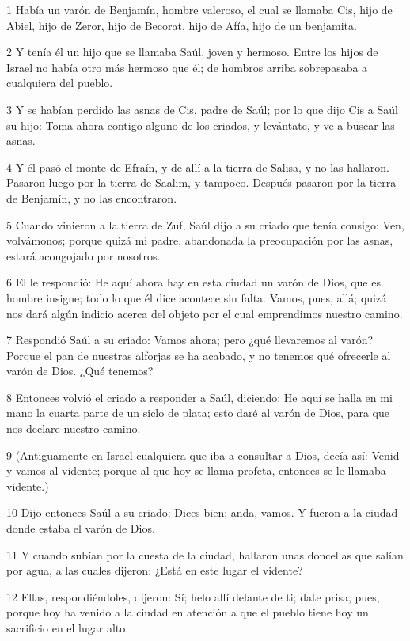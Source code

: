 \par 1 Había un varón de Benjamín, hombre valeroso, el cual se llamaba Cis, hijo de Abiel, hijo de Zeror, hijo de Becorat, hijo de Afía, hijo de un benjamita.
\par 2 Y tenía él un hijo que se llamaba Saúl, joven y hermoso. Entre los hijos de Israel no había otro más hermoso que él; de hombros arriba sobrepasaba a cualquiera del pueblo.
\par 3 Y se habían perdido las asnas de Cis, padre de Saúl; por lo que dijo Cis a Saúl su hijo: Toma ahora contigo alguno de los criados, y levántate, y ve a buscar las asnas.
\par 4 Y él pasó el monte de Efraín, y de allí a la tierra de Salisa, y no las hallaron. Pasaron luego por la tierra de Saalim, y tampoco. Después pasaron por la tierra de Benjamín, y no las encontraron.
\par 5 Cuando vinieron a la tierra de Zuf, Saúl dijo a su criado que tenía consigo: Ven, volvámonos; porque quizá mi padre, abandonada la preocupación por las asnas, estará acongojado por nosotros.
\par 6 El le respondió: He aquí ahora hay en esta ciudad un varón de Dios, que es hombre insigne; todo lo que él dice acontece sin falta. Vamos, pues, allá; quizá nos dará algún indicio acerca del objeto por el cual emprendimos nuestro camino.
\par 7 Respondió Saúl a su criado: Vamos ahora; pero ¿qué llevaremos al varón? Porque el pan de nuestras alforjas se ha acabado, y no tenemos qué ofrecerle al varón de Dios. ¿Qué tenemos?
\par 8 Entonces volvió el criado a responder a Saúl, diciendo: He aquí se halla en mi mano la cuarta parte de un siclo de plata;  esto daré al varón de Dios, para que nos declare nuestro camino.
\par 9 (Antiguamente en Israel cualquiera que iba a consultar a Dios, decía así: Venid y vamos al vidente; porque al que hoy se llama profeta, entonces se le llamaba vidente.)
\par 10 Dijo entonces Saúl a su criado: Dices bien; anda, vamos. Y fueron a la ciudad donde estaba el varón de Dios.
\par 11 Y cuando subían por la cuesta de la ciudad, hallaron unas doncellas que salían por agua, a las cuales dijeron: ¿Está en este lugar el vidente?
\par 12 Ellas, respondiéndoles, dijeron: Sí; helo allí delante de ti; date prisa, pues, porque hoy ha venido a la ciudad en atención a que el pueblo tiene hoy un sacrificio en el lugar alto.
